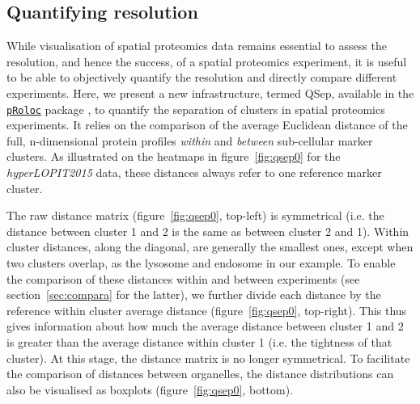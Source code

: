 \documentclass[12pt]{article}\usepackage[]{graphicx}\usepackage[]{color}
\newcommand{\Rpackage}[1]{\texttt{#1}}
\newcommand\Biocpkg[1]{%
  {\href{http://bioconductor.org/packages/#1}%
    {\Rpackage{#1}}}}
\begin{document}
\subsection{Quantifying resolution}\label{sec:qsep}

While visualisation of spatial proteomics data remains essential to
assess the resolution, and hence the success, of a spatial proteomics
experiment, it is useful to be able to objectively quantify the
resolution and directly compare different experiments. Here, we
present a new infrastructure, termed QSep, available in the
\Biocpkg{pRoloc} package \cite{Gatto:2014a}, to quantify the
separation of clusters in spatial proteomics experiments. It relies on
the comparison of the average Euclidean distance of the full,
n-dimensional protein profiles \textit{within} and \textit{between}
sub-cellular marker clusters. As illustrated on the heatmaps in
figure~\ref{fig:qsep0} for the \textit{hyperLOPIT2015} data, these
distances always refer to one reference marker cluster.

The raw distance matrix (figure~\ref{fig:qsep0}, top-left) is
symmetrical (i.e. the distance between cluster 1 and 2 is the same as
between cluster 2 and 1). Within cluster distances, along the
diagonal, are generally the smallest ones, except when two clusters
overlap, as the lysosome and endosome in our example. To enable the
comparison of these distances within and between experiments (see
section~\ref{sec:compara} for the latter), we further divide each
distance by the reference within cluster average distance
(figure~\ref{fig:qsep0}, top-right). This thus gives information about
how much the average distance between cluster 1 and 2 is greater than
the average distance within cluster 1 (i.e. the tightness of that
cluster). At this stage, the distance matrix is no longer
symmetrical. To facilitate the comparison of distances between
organelles, the distance distributions can also be visualised as
boxplots (figure~\ref{fig:qsep0}, bottom).
\end{document}
